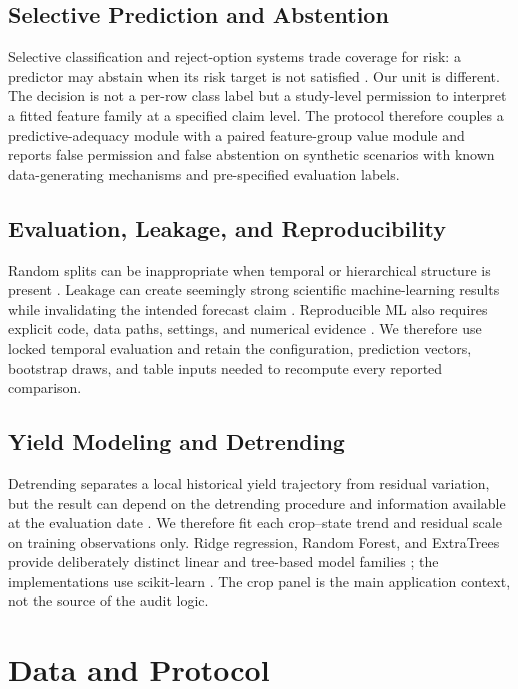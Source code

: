 \documentclass[conference]{IEEEtran}
\begin{document}
\subsection{Selective Prediction and Abstention}
Selective classification and reject-option systems trade coverage for risk:
a predictor may abstain when its risk target is not satisfied
\cite{ElYanivWiener2010,GeifmanElYaniv2017}. Our unit is different. The decision
is not a per-row class label but a study-level permission to interpret a fitted
feature family at a specified claim level. The protocol therefore couples a
predictive-adequacy module with a paired feature-group value module and reports
false permission and false abstention on synthetic scenarios with known
data-generating mechanisms and pre-specified evaluation labels.

\subsection{Evaluation, Leakage, and Reproducibility}
Random splits can be inappropriate when temporal or hierarchical structure is
present \cite{Roberts2017}. Leakage can create seemingly strong scientific
machine-learning results while invalidating the intended forecast claim
\cite{KapoorNarayanan2023}. Reproducible ML also requires explicit code, data
paths, settings, and numerical evidence \cite{Pineau2021}. We therefore use
locked temporal evaluation and retain the configuration, prediction vectors,
bootstrap draws, and table inputs needed to recompute every reported comparison.

\subsection{Yield Modeling and Detrending}
Detrending separates a local historical yield trajectory from residual variation,
but the result can depend on the detrending procedure and information available at
the evaluation date \cite{Lu2017,Meng2024}. We therefore fit each crop--state
trend and residual scale on training observations only. Ridge regression, Random
Forest, and ExtraTrees provide deliberately distinct linear and tree-based model
families \cite{HoerlKennard1970,Breiman2001,Geurts2006}; the implementations use
scikit-learn \cite{Pedregosa2011}. The crop panel is the main application context,
not the source of the audit logic.

\section{Data and Protocol}
\end{document}
